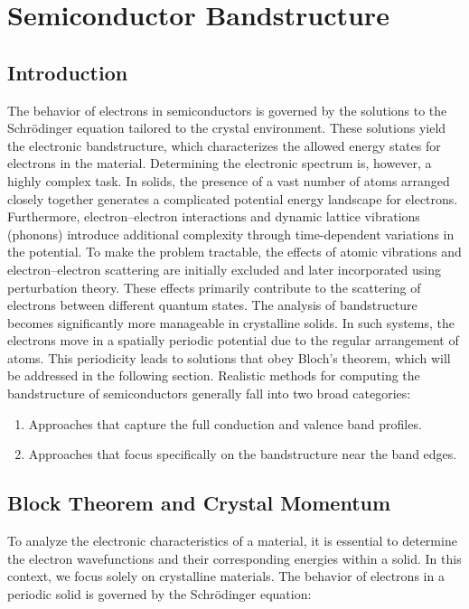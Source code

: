 \chapter{Semiconductor Bandstructure}

\section{Introduction}
The behavior of electrons in semiconductors is governed by the solutions to the Schrödinger equation tailored to the crystal environment. These solutions yield the electronic bandstructure, which characterizes the allowed energy states for electrons in the material. Determining the electronic spectrum is, however, a highly complex task. In solids, the presence of a vast number of atoms arranged closely together generates a complicated potential energy landscape for electrons. Furthermore, electron–electron interactions and dynamic lattice vibrations (phonons) introduce additional complexity through time-dependent variations in the potential.
To make the problem tractable, the effects of atomic vibrations and electron–electron scattering are initially excluded and later incorporated using perturbation theory. These effects primarily contribute to the scattering of electrons between different quantum states.
The analysis of bandstructure becomes significantly more manageable in crystalline solids. In such systems, the electrons move in a spatially periodic potential due to the regular arrangement of atoms. This periodicity leads to solutions that obey Bloch’s theorem, which will be addressed in the following section.
Realistic methods for computing the bandstructure of semiconductors generally fall into two broad categories:
\begin{enumerate}
	\item Approaches that capture the full conduction and valence band profiles.
	\item Approaches that focus specifically on the bandstructure near the band edges.
\end{enumerate}

\section{Block Theorem and Crystal Momentum}
To analyze the electronic characteristics of a material, it is essential to determine the electron wavefunctions and their corresponding energies within a solid. In this context, we focus solely on crystalline materials. The behavior of electrons in a periodic solid is governed by the Schrödinger equation:

